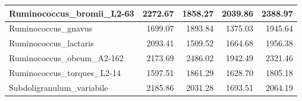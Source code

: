 \documentclass[12pt,a4paper]{article}
\begin{document}
\begin{table}[ht]
\begin{center}
\begin{tabular}{|l*{4}{|r}|}
Ruminococcus\_bromii\_L2-63 & 2272.67 & 1858.27 & 2039.86 & 2388.97 \\ \hline
Ruminococcus\_gnavus & 1699.07 & 1893.84 & 1375.03 & 1945.64 \\ \hline
Ruminococcus\_lactaris & 2093.41 & 1509.52 & 1664.68 & 1956.38 \\ \hline
Ruminococcus\_obeum\_A2-162 & 2173.69 & 2486.02 & 1942.49 & 2321.46 \\ \hline
Ruminococcus\_torques\_L2-14 & 1597.51 & 1861.29 & 1628.70 & 1805.18 \\ \hline
Subdoligranulum\_variabile & 2185.86 & 2031.28 & 1693.51 & 2064.19 \\ \hline
\end{tabular}
\end{center}
\end{table}
\end{document}
